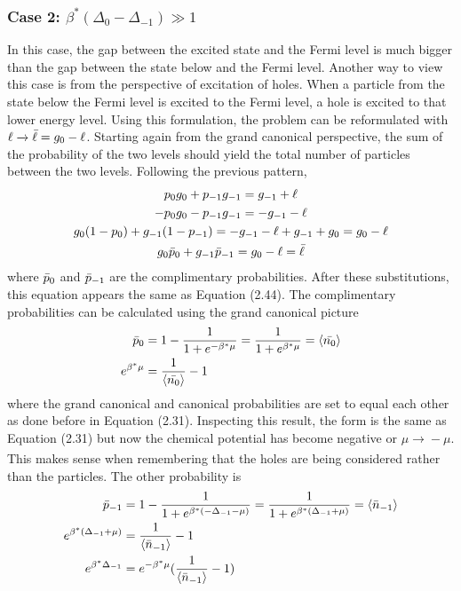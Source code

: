 \subsubsection{Case 2: $\beta^*(\Delta_0-\Delta_{-1})\gg 1$}
In this case, the gap between the excited state and the Fermi level is much bigger
than the gap between the state below and the Fermi level. Another way to view this case is from the perspective of excitation of holes. When a particle from the state below the Fermi level is excited to the Fermi level, a hole is excited to that lower energy level. Using this formulation, the problem can be reformulated with $\ell \xrightarrow[]{} \Bar{\ell}=g_0-\ell$. Starting again from the grand canonical perspective, the sum of the probability of the two levels should yield the total number of particles between the two levels. Following the previous pattern,
\begin{gather}
    p_0g_0+p_{-1}g_{-1}=g_{-1}+\ell\nonumber\\
    -p_0g_0-p_{-1}g_{-1}=-g_{-1}-\ell\nonumber\\
    g_0(1-p_0)+g_{-1}(1-p_{-1})=-g_{-1}-\ell+g_{-1}+g_0=g_0-\ell\nonumber\\
    g_0\Bar{p}_0+g_{-1}\Bar{p}_{-1}=g_0-\ell=\Bar{\ell}
\end{gather}
where $\Bar{p}_0$ and $\Bar{p}_{-1}$ are the complimentary probabilities. After these substitutions, this equation appears the same as Equation (2.44). The complimentary probabilities can be calculated using the grand canonical picture 
\begin{align}
    \Bar{p}_0&=1-\frac{1}{1+e^{-\beta^*\mu}}=\frac{1}{1+e^{\beta^*\mu}}=\left<{\Bar{n_0}}\right>\\
    e^{\beta^*\mu}&=\frac{1}{\left<{\Bar{n_0}}\right>}-1
\end{align}
where the grand canonical and canonical probabilities are set to equal each other as done before in Equation (2.31). Inspecting this result, the form is the same as Equation (2.31) but now the chemical potential has become negative or $\mu\xrightarrow[]{}-\mu$. This makes sense when remembering that the holes are being considered rather than the particles. The other probability is 
\begin{align}
    \Bar{p}_{-1}&=1-\frac{1}{1+e^{\beta^*(-\Delta_{-1}-\mu)}}=\frac{1}{1+e^{\beta^*(\Delta_{-1}+\mu)}}=\left<{\Bar{n}_{-1}}\right>\\
    e^{\beta^*(\Delta_{-1}+\mu)}&=\frac{1}{\left<{\Bar{n}_{-1}}\right>}-1\nonumber\\
    e^{\beta^*\Delta_{-1}}&=e^{-\beta^*\mu}(\frac{1}{\left<{\Bar{n}_{-1}}\right>}-1)
\end{align}
